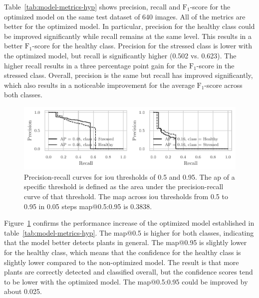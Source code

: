 \documentclass[draft,final]{vutinfth} %
\begin{document}
Table~\ref{tab:model-metrics-hyp} shows precision, recall and
$\mathrm{F}_1$-score for the optimized model on the same test dataset
of \num{640} images. All of the metrics are better for the optimized
model. In particular, precision for the healthy class could be
improved significantly while recall remains at the same level. This
results in a better $\mathrm{F}_1$-score for the healthy
class. Precision for the stressed class is lower with the optimized
model, but recall is significantly higher (\num{0.502}
vs. \num{0.623}). The higher recall results in a three percentage
point gain for the $\mathrm{F}_1$-score in the stressed
class. Overall, precision is the same but recall has improved
significantly, which also results in a noticeable improvement for the
average $\mathrm{F}_1$-score across both classes.

\begin{figure}
  \centering
  \includegraphics{graphics/APModel-model-original-relabeled.pdf}
  \caption[Optimized aggregate model AP@0.5 and
  AP@0.95.]{Precision-recall curves for \gls{iou} thresholds of
    \num{0.5} and \num{0.95}. The \gls{ap} of a specific threshold is
    defined as the area under the precision-recall curve of that
    threshold. The \gls{map} across \gls{iou} thresholds from
    \num{0.5} to \num{0.95} in \num{0.05} steps \gls{map}@0.5:0.95 is
    \num{0.3838}.}
  \label{fig:aggregate-ap-hyp}
\end{figure}

Figure~\ref{fig:aggregate-ap-hyp} confirms the performance increase of
the optimized model established in
table~\ref{tab:model-metrics-hyp}. The \gls{map}@0.5 is higher for
both classes, indicating that the model better detects plants in
general. The \gls{map}@0.95 is slightly lower for the healthy class,
which means that the confidence for the healthy class is slightly
lower compared to the non-optimized model. The result is that more
plants are correctly detected and classified overall, but the
confidence scores tend to be lower with the optimized model. The
\gls{map}@0.5:0.95 could be improved by about \num{0.025}.
\end{document}
